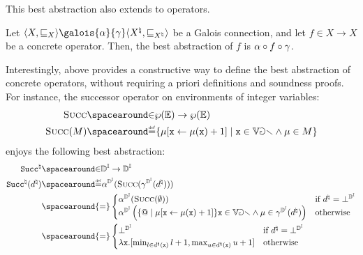 \begin{description}
\begin{remark}
  \end{remark}
  This best abstraction also extends to operators.
  \begin{definition}
    Let $\tuple{X}{\sqsubseteq_X} \galois{\abstraction}{\concretization}\tuple{X^\natural}{\sqsubseteq_{X^\natural}}$ be a Galois connection, and let $f\in X\to X$ be a concrete operator. Then, the best abstraction of $f$ is $\alpha \circ f \circ \gamma$.
  \end{definition}
  Interestingly,  above provides a constructive way to define the best abstraction of concrete operators, without requiring a priori definitions and soundness proofs.
  For instance, the successor operator on environments of integer variables:
  \begin{align*}
    \textsc{Succ} &\IN \setof\env \to \setof\env \\
    \textsc{Succ}(\defsetofenvs) &\DefeQ \setdef{\updatemem{\defenv}{\defvariable}{\defenv(\defvariable) + 1}}{\defvariable\in\variables \land \defenv\in\defsetofenvs}
  \end{align*}
  enjoys the following best abstraction:
  \begin{align*}
    \texttt{Succ}^\natural &\IN \intervalabstractdomaintype \to \intervalabstractdomaintype \\
    \texttt{Succ}^\natural(\defabstractvalue) &\DefeQ \intervalabstractdomainabstraction(\textsc{Succ}(\intervalabstractdomainconcretization(\defabstractvalue))) \\
    &\spacearound{=} \begin{cases}
      \intervalabstractdomainabstraction(\textsc{Succ}(\emptyset)) &\text{if $\defabstractvalue = \intervalabstractdomainbottom$} \\
      \intervalabstractdomainabstraction\left(\setdef@{\updatemem{\defenv}{\defvariable}{\defenv(\defvariable) + 1}}{\defvariable\in\variables \land \defenv\in\intervalabstractdomainconcretization(\defabstractvalue)}\right) &\text{otherwise}
    \end{cases} \\
    &\spacearound{=} \begin{cases}
      \intervalabstractdomainbottom & \text{if } \defabstractvalue = \intervalabstractdomainbottom \\
      \lambda \defvariable.\interval{\min_{{l\in\defabstractvalue(\defvariable)}} l + 1}{\max_{u\in\defabstractvalue(\defvariable)} {u + 1}} & \text{otherwise}

\end{cases}
\end{align*}
\end{description}
